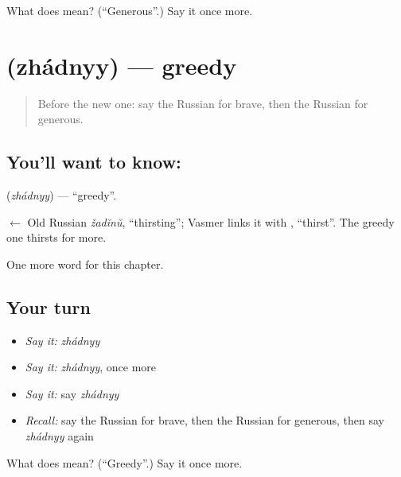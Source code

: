\begin{tcolorbox}[breakable,colback=teal!4,colframe=teal!35!black,title={Before you move on}]
What does  mean? (\textquotedblleft{}Generous\textquotedblright{}.) Say it once more.
\end{tcolorbox}
\section[\texorpdfstring{\ru{жадный} (zhádnyy)}{жадный (zhádnyy)}]{ (zhádnyy) — greedy}

\label{lesson:RU-C186-zhadnyy}



\begin{quote}
Before the new one: say the Russian for brave, then the Russian for generous.
\end{quote}

\subsection*{You'll want to know: }
\textbf{} (\emph{zhádnyy}) — \textquotedblleft{}greedy\textquotedblright{}.

\begin{cousinweb}
\textbf{} $\leftarrow$ Old Russian \emph{žadĭnŭ}, \textquotedblleft{}thirsting\textquotedblright{}; Vasmer links it with \emph{}, \textquotedblleft{}thirst\textquotedblright{}. The greedy one thirsts for more.
\end{cousinweb}

\begin{grammarlens}[title={What you've built}]
One more word for this chapter.
\end{grammarlens}

\subsection*{Your turn}
\begin{itemize}
\raggedright
  \item \emph{Say it:} \emph{zhádnyy}
  \item \emph{Say it:} \emph{zhádnyy}, once more
  \item \emph{Say it:} say \emph{zhádnyy}
  \item \emph{Recall:} say the Russian for brave, then the Russian for generous, then say \emph{zhádnyy} again
\end{itemize}

\begin{tcolorbox}[breakable,colback=teal!4,colframe=teal!35!black,title={Before you move on}]
What does  mean? (\textquotedblleft{}Greedy\textquotedblright{}.) Say it once more.
\end{tcolorbox}
